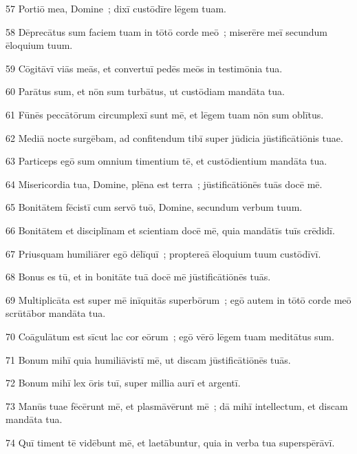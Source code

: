 \psalmVerse
  {\phantom{0}57}
  {Portiō mea, Domine~; dixī custōdīre lēgem tuam.}


\psalmVerse
  {\phantom{0}58}
  {Dēprecātus sum faciem tuam in tōtō corde meō~; miserēre meī secundum ēloquium tuum.}


\psalmVerse
  {\phantom{0}59}
  {Cōgitāvī viās meās, et convertuī pedēs meōs in testimōnia tua.}


\psalmVerse
  {\phantom{0}60}
  {Parātus sum, et nōn sum turbātus, ut custōdiam mandāta tua.}


\psalmVerse
  {\phantom{0}61}
  {Fūnēs peccātōrum circumplexī sunt mē, et lēgem tuam nōn sum oblītus.}


\psalmVerse
  {\phantom{0}62}
  {Mediā nocte surgēbam, ad confitendum tibī super jūdicia jūstificātiōnis tuae.}


\psalmVerse
  {\phantom{0}63}
  {Particeps egō sum omnium timentium tē, et custōdientium mandāta tua.}


\psalmVerse
  {\phantom{0}64}
  {Misericordia tua, Domine, plēna est terra~; jūstificātiōnēs tuās docē mē.}


\psalmVerse
  {\phantom{0}65}
  {Bonitātem fēcistī cum servō tuō, Domine, secundum verbum tuum.}


\psalmVerse
  {\phantom{0}66}
  {Bonitātem et disciplīnam et scientiam docē mē, quia mandātīs tuīs crēdidī.}


\psalmVerse
  {\phantom{0}67}
  {Priusquam humiliārer egō dēlīquī~; proptereā ēloquium tuum custōdīvī.}


\psalmVerse
  {\phantom{0}68}
  {Bonus es tū, et in bonitāte tuā docē mē jūstificātiōnēs tuās.}


\psalmVerse
  {\phantom{0}69}
  {Multiplicāta est super mē inīquitās superbōrum~; egō autem in tōtō corde meō scrūtābor mandāta tua.}


\psalmVerse
  {\phantom{0}70}
  {Coāgulātum est sīcut lac cor eōrum~; egō vērō lēgem tuam meditātus sum.}


\psalmVerse
  {\phantom{0}71}
  {Bonum mihī quia humiliāvistī mē, ut discam jūstificātiōnēs tuās.}


\psalmVerse
  {\phantom{0}72}
  {Bonum mihī lex ōris tuī, super millia aurī et argentī.}



\psalmVerse
  {\phantom{0}73}
  {Manūs tuae fēcērunt mē, et plasmāvērunt mē~; dā mihī intellectum, et discam mandāta tua.}


\psalmVerse
  {\phantom{0}74}
  {Quī timent tē vidēbunt mē, et laetābuntur, quia in verba tua superspērāvī.}


